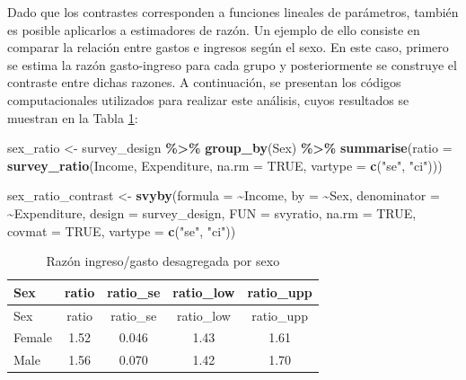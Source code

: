 \documentclass[
  spanish,
  12pt,
]{book}
\newenvironment{Shaded}{\begin{snugshade}}{\end{snugshade}}
\newcommand{\AttributeTok}[1]{\textcolor[rgb]{0.13,0.29,0.53}{#1}}
\newcommand{\ConstantTok}[1]{\textcolor[rgb]{0.56,0.35,0.01}{#1}}
\newcommand{\FunctionTok}[1]{\textcolor[rgb]{0.13,0.29,0.53}{\textbf{#1}}}
\newcommand{\NormalTok}[1]{#1}
\newcommand{\OtherTok}[1]{\textcolor[rgb]{0.56,0.35,0.01}{#1}}
\newcommand{\SpecialCharTok}[1]{\textcolor[rgb]{0.81,0.36,0.00}{\textbf{#1}}}
\newcommand{\StringTok}[1]{\textcolor[rgb]{0.31,0.60,0.02}{#1}}
\begin{document}
Dado que los contrastes corresponden a funciones lineales de parámetros, también es posible aplicarlos a estimadores de razón. Un ejemplo de ello consiste en comparar la relación entre gastos e ingresos según el sexo. En este caso, primero se estima la razón gasto-ingreso para cada grupo y posteriormente se construye el contraste entre dichas razones. A continuación, se presentan los códigos computacionales utilizados para realizar este análisis, cuyos resultados se muestran en la Tabla \ref{tab:tab-razon-ingreso-gasto-sexo}:

\begin{Shaded}
\begin{Highlighting}[]
\NormalTok{sex\_ratio }\OtherTok{\textless{}{-}}\NormalTok{ survey\_design }\SpecialCharTok{\%\textgreater{}\%}
  \FunctionTok{group\_by}\NormalTok{(Sex) }\SpecialCharTok{\%\textgreater{}\%}
  \FunctionTok{summarise}\NormalTok{(}\AttributeTok{ratio =} \FunctionTok{survey\_ratio}\NormalTok{(Income,}
\NormalTok{                                 Expenditure,}
                                 \AttributeTok{na.rm =} \ConstantTok{TRUE}\NormalTok{,}
                                 \AttributeTok{vartype =} \FunctionTok{c}\NormalTok{(}\StringTok{"se"}\NormalTok{, }\StringTok{"ci"}\NormalTok{)))}

\NormalTok{sex\_ratio\_contrast }\OtherTok{\textless{}{-}} \FunctionTok{svyby}\NormalTok{(}\AttributeTok{formula =} \SpecialCharTok{\textasciitilde{}}\NormalTok{Income,}
                            \AttributeTok{by =} \SpecialCharTok{\textasciitilde{}}\NormalTok{Sex,}
                            \AttributeTok{denominator =} \SpecialCharTok{\textasciitilde{}}\NormalTok{Expenditure,}
                            \AttributeTok{design =}\NormalTok{ survey\_design,}
                            \AttributeTok{FUN =}\NormalTok{ svyratio,}
                            \AttributeTok{na.rm =} \ConstantTok{TRUE}\NormalTok{,}
                            \AttributeTok{covmat =} \ConstantTok{TRUE}\NormalTok{,}
                            \AttributeTok{vartype =} \FunctionTok{c}\NormalTok{(}\StringTok{"se"}\NormalTok{, }\StringTok{"ci"}\NormalTok{))}
\end{Highlighting}
\end{Shaded}

\begin{longtable}[]{@{}lcccc@{}}
\caption{\label{tab:tab-razon-ingreso-gasto-sexo}Razón ingreso/gasto desagregada por sexo}\tabularnewline
\toprule\noalign{}
Sex & ratio & ratio\_se & ratio\_low & ratio\_upp \\
\midrule\noalign{}
\endfirsthead
\toprule\noalign{}
Sex & ratio & ratio\_se & ratio\_low & ratio\_upp \\
\midrule\noalign{}
\endhead
\bottomrule\noalign{}
\endlastfoot
Female & 1.52 & 0.046 & 1.43 & 1.61 \\
Male & 1.56 & 0.070 & 1.42 & 1.70 \\
\end{longtable}
\end{document}
